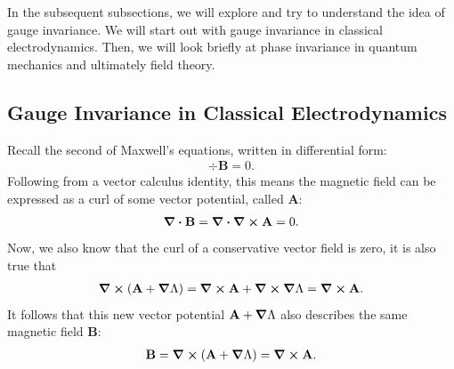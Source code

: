 \documentclass[a4paper,11pt]{article}
\numberwithin{equation}{section}
\theoremstyle{definition}
\begin{document}
In the subsequent subsections, we will explore and try to understand the idea of gauge invariance. We will start out with gauge invariance in classical electrodynamics. Then, we will look briefly at phase invariance in quantum mechanics and ultimately field theory.  
\subsection{Gauge Invariance in Classical Electrodynamics}
Recall the second of Maxwell's equations, written in differential form:
\begin{align}
\div{\mathbf{B}} = 0.
\end{align}
Following from a vector calculus identity, this means the magnetic field can be expressed as a curl of some vector potential, called $\mathbf{A}$:
\begin{align}
\div{\mathbf{B}} = \div{\curl\mathbf{A}} = 0.
\end{align}
Now, we also know that the curl of a conservative vector field is zero, it is also true that
\begin{align}
\curl{(\mathbf{A} + \grad{\Lambda})}= \curl{\mathbf{A}} + \curl{\grad{\Lambda}} = \curl{\mathbf{A}}.
\end{align}
It follows that this new vector potential $\mathbf{A} + \grad{\Lambda}$ also describes the same magnetic field $\mathbf{B}$:
\begin{align}
\mathbf{B} = \curl{(\mathbf{A} + \grad{\Lambda})} = \curl{\mathbf{A}}.
\end{align}
\end{document}
